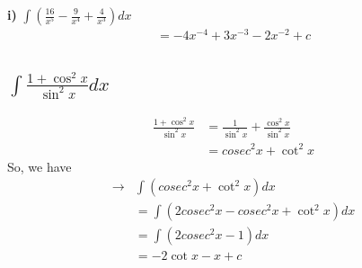 \documentclass{article}
\begin{document}
\begin{multicols}{2}
\textbf{i)} $\int (\frac{16}{x^5} - \frac{9}{x^4} + \frac{4}{x^3})dx$
\begin{align*}
    = -4x^{-4} + 3x^{-3} - 2x^{-2} + c
\end{align*}


\subsection{$\int \frac{1 + \cos^2x}{\sin^2x} dx$}
\begin{align*}
    \frac{1 + \cos^2x}{\sin^2x} &= \frac{1}{\sin^2x} + \frac{\cos^2x}{\sin^2x} \\
                                &= cosec^2x + \cot^2x
\end{align*}
So, we have
\begin{align*}
    \rightarrow &\int (cosec^2x + \cot^2x) dx \\
                &= \int (2cosec^2x - cosec^2x + \cot^2x) dx \\
                &= \int (2cosec^2x - 1) dx \\
                &= - 2 \cot x - x + c
\end{align*}

\end{multicols}
\end{document}
